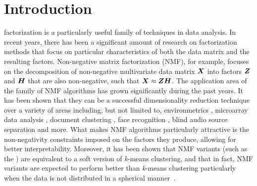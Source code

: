 \documentclass[10pt,journal,compsoc]{IEEEtran}
\begin{document}
\maketitle


\IEEEdisplaynotcompsoctitleabstractindextext


%
\IEEEpeerreviewmaketitle


\section{Introduction}
 factorization is a particularly useful family of techniques in data analysis. In recent years, there has been a significant amount of research on factorization methods that focus on particular characteristics of both the data matrix and the resulting factors. Non-negative matrix factorization (NMF), for example, focuses on the decomposition of non-negative multivariate data matrix $\boldsymbol X$ into factors $\boldsymbol Z$ and $\boldsymbol H$ that are also non-negative, such that $\boldsymbol X \approx \boldsymbol Z \boldsymbol H$. The application area of the family of NMF algorithms has grown significantly during the past years. It has been shown that they can be a successful dimensionality reduction technique over a variety of areas including, but not limited to, environmetrics \cite{paatero1994positive}, microarray  data analysis \cite{brunet2004metagenes,devarajan2008nonnegative}, document clustering \cite{berry2005email}, face recognition \cite{zafeiriou2006exploiting,kotsia2007novel}, blind audio source separation \cite{weninger2012optimization} and more. What makes NMF algorithms particularly attractive is the non-negativity constraints imposed on the factors they produce, allowing for better interpretability. Moreover, it has been shown that NMF variants (such as the \seminmf) are equivalent to a soft version of \emph{k}-means clustering, and that in fact, NMF variants are expected to perform better than \emph{k}-means clustering particularly when the data is not distributed in a spherical manner~\cite{ding2010convex,ding2005equivalency}. 
\end{document}
